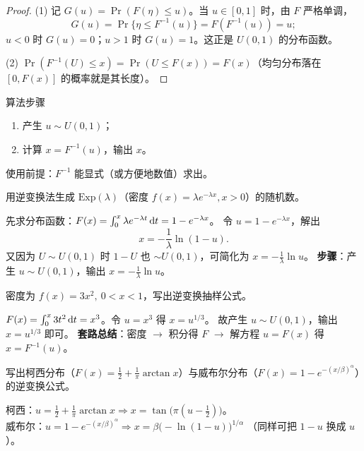 \begin{proof}
(1) 记 $G(u)=\Pr(F(\eta)\le u)$。当 $u\in[0,1]$ 时，由 $F$ 严格单调，
\[
G(u)=\Pr\{\eta\le F^{-1}(u)\}=F(F^{-1}(u))=u;
\]
$u<0$ 时 $G(u)=0$；$u>1$ 时 $G(u)=1$。这正是 $U(0,1)$ 的分布函数。

(2) $\Pr(F^{-1}(U)\le x)=\Pr(U\le F(x))=F(x)$（均匀分布落在 $[0,F(x)]$ 的概率就是其长度）。
\end{proof}

\begin{ebox}{算法步骤}
\begin{enumerate}[leftmargin=2em]
  \item 产生 $u\sim U(0,1)$；
  \item 计算 $x=F^{-1}(u)$，输出 $x$。
\end{enumerate}
使用前提：$F^{-1}$ 能显式（或方便地数值）求出。
\end{ebox}

\begin{exbox}
用逆变换法生成 $\mathrm{Exp}(\lambda)$（密度 $f(x)=\lambda e^{-\lambda x},x>0$）的随机数。
\end{exbox}
\begin{sol}
先求分布函数：$F(x)=\int_0^x\lambda e^{-\lambda t}\,\mathrm{d} t=1-e^{-\lambda x}$。
令 $u=1-e^{-\lambda x}$，解出
\[
x=-\frac1\lambda\ln(1-u).
\]
又因为 $U\sim U(0,1)$ 时 $1-U$ 也 $\sim U(0,1)$，可简化为 $x=-\frac1\lambda\ln u$。
\textbf{步骤}：产生 $u\sim U(0,1)$，输出 $x=-\frac1\lambda\ln u$。
\end{sol}

\begin{exbox}[给密度求抽样公式]
密度为 $f(x)=3x^2,\ 0<x<1$，写出逆变换抽样公式。
\end{exbox}
\begin{sol}
$F(x)=\int_0^x3t^2\,\mathrm{d} t=x^3$。令 $u=x^3$ 得 $x=u^{1/3}$。
故产生 $u\sim U(0,1)$，输出 $x=u^{1/3}$ 即可。
\textbf{套路总结}：密度 $\to$ 积分得 $F$ $\to$ 解方程 $u=F(x)$ 得 $x=F^{-1}(u)$。
\end{sol}

\begin{exbox}[柯西分布与威布尔分布]
写出柯西分布（$F(x)=\frac12+\frac1\pi\arctan x$）与威布尔分布（$F(x)=1-e^{-(x/\beta)^\alpha}$）的逆变换公式。
\end{exbox}
\begin{sol}
柯西：$u=\frac12+\frac1\pi\arctan x\Rightarrow x=\tan\big(\pi(u-\frac12)\big)$。\\
威布尔：$u=1-e^{-(x/\beta)^\alpha}\Rightarrow x=\beta\big(-\ln(1-u)\big)^{1/\alpha}$
（同样可把 $1-u$ 换成 $u$）。
\end{sol}

